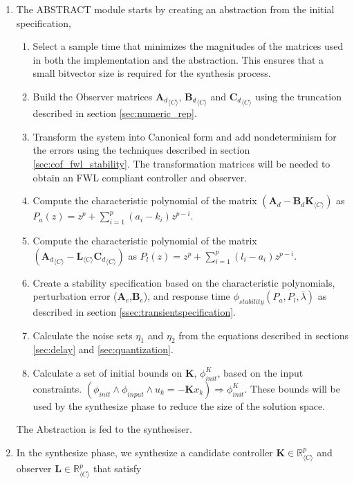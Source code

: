 \documentclass[sigconf]{llncs}
\newcommand{\mat}[1]{\boldsymbol{#1}}
\begin{document}
\begin{enumerate}
\item 
The {\sc ABSTRACT} module starts by creating an abstraction from the initial specification,
\begin{enumerate}
\item Select a sample time that minimizes the magnitudes of the matrices used in both the
implementation and the abstraction. This ensures that a small bitvector size is required for
the synthesis process.
\item Build the Observer matrices ${\mat{A}_d}_{\langle C \rangle}$, ${\mat{B}_d}_{\langle C \rangle}$
and ${\mat{C}_d}_{\langle C \rangle}$ using the truncation described in section \ref{sec:numeric_rep}.
\item Transform the system into Canonical form and add nondeterminism for the errors
using the techniques described in section \ref{sec:cof_fwl_stability}. The transformation
matrices will be needed to obtain an FWL compliant controller and observer.
\item Compute the characteristic polynomial of the matrix $(\mat{A}_d-\mat{B}_d\mat{K}_{\langle C \rangle})$
as $P_a(z) = z^p+\sum_{i=1}^p{(a_i-k_i)z^{p-i}}$. 
\item Compute the characteristic polynomial of the matrix $({\mat{A}_d}_{\langle C \rangle}-\mat{L}_{\langle C \rangle}{\mat{C}_d}_{\langle C \rangle})$
as $P_l(z) = z^p+\sum_{i=1}^p{(l_i-a_i)z^{p-i}}$. 
\item Create a stability specification based on the characteristic polynomials, perturbation
error ($\mat{A}_e$,$\mat{B}_e$), and response time $\phi_{stability}(P_a,P_l,\overline{\lambda})$
as described in section \ref{ssec:transientspecification}.
\item Calculate the noise sets $\eta_1$ and $\eta_2$ from the equations
described in sections \ref{sec:delay} and \ref{sec:quantization}.
\item Calculate a set of initial bounds on $\mat{K}$, $\phi_\mathit{init}^{K}$,
based on the input constraints.  
%
$(\phi_\mathit{init} \wedge \phi_\mathit{input} \wedge u_k=-\mat{K} x_k)
\Rightarrow \phi_\mathit{init}^{K}$.
These bounds will be used by the {\sc synthesize} phase to reduce the size of the solution space. 
\end{enumerate}
The Abstraction is fed to the synthesiser.
\item In the {\sc synthesize} phase, we synthesize a candidate controller $\mat{K} \in \mathbb{R}_{\langle C\rangle}^p$
and observer $\mat{L} \in \mathbb{R}_{\langle C\rangle}^p$ that satisfy

\end{enumerate}
\end{document}
